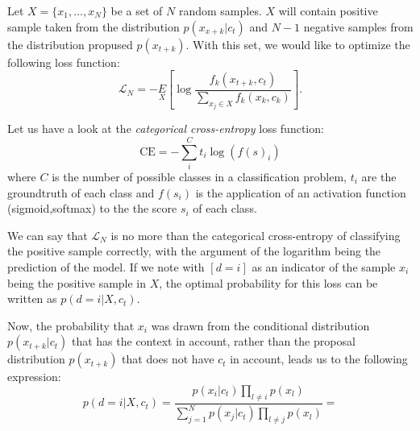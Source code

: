 Let $X = \{x_1,\dots,x_N\}$ be a set of $N$ random samples. $X$ will contain positive sample taken from the distribution $p(x_{x+k}|c_t)$ and $N-1$ negative
samples from the distribution propused $p(x_{t+k})$. With this set, we would like to optimize the following loss function:
$$
\mathcal L_N = - \underset{X}{E} \left[\log \frac{f_k(x_{t+k},c_t)}{\sum_{x_j \in X} f_k(x_k,c_k)}\right].
$$

Let us have a look at the \emph{categorical cross-entropy} loss function:
\[
    \text{CE} = -\sum_i^C t_i \log(f(s)_i)    
\]
where $C$ is the number of possible classes in a classification problem, $t_i$ are the groundtruth of each class and $f(s_i)$ is the application of an activation function (sigmoid,softmax) to the the score $s_i$ of each class.

We can say that $\mathcal L_N$ is no more than the categorical cross-entropy of classifying the positive sample correctly, with the argument of the logarithm being the prediction
of the model. If we note with $[d = i]$ as an indicator of the sample $x_i$ being the positive sample in $X$, the optimal probability for this loss can be written as $p(d = i|X,c_t)$. 

Now, the probability that $x_i$ was drawn from the conditional distribution $p(x_{t+k}|c_t)$ that has the context in account, rather than the proposal distribution $p(x_{t+k})$ that does not have $c_t$ in account, leads us to the following expression:
$$
p(d = i | X , c_t) = \frac{p(x_i|c_t) \prod_{l \neq i}p(x_l)}{\sum_{j=1}^N p(x_j|c_t) \prod_{l \neq j} p(x_l)} = 
$$